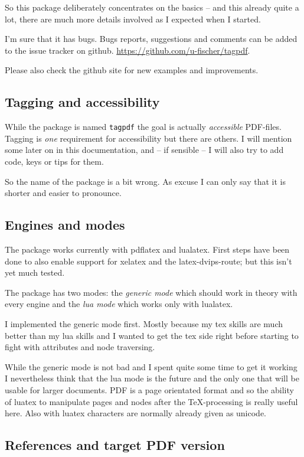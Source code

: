 \documentclass[DIV=12,parskip=half-,bibliography=totoc]{scrartcl}
\newcommand\PDF{PDF}
\begin{document}
So this package deliberately concentrates on the basics -- and this already quite a lot, there are much more details involved as I expected when I started.

I'm sure that it has bugs. Bugs reports, suggestions and comments can be added to the issue tracker on github. \url{https://github.com/u-fischer/tagpdf}.

Please also check the github site for new examples and improvements.

\subsection{Tagging and accessibility}

While the package is named \texttt{tagpdf} the goal is actually \emph{accessible} \PDF{}-files. Tagging is \emph{one} requirement for accessibility but there are others. I will mention some later on in this documentation, and -- if sensible -- I will also try to add code, keys or tips for them.

So the name of the package is a bit wrong. As excuse I can only say that it is shorter and easier to pronounce.


\subsection{Engines and modes}

The package works currently with pdflatex and lualatex. First steps have been done to also enable support for xelatex and the latex-dvips-route; but this isn't yet much tested.

The package has two modes: the \emph{generic mode} which should work in theory with every engine and the \emph{lua mode} which works only with lualatex.

I implemented the generic mode first. Mostly because my tex skills are much better than my lua skills and I wanted to get the tex side right before starting to fight with attributes and node traversing.

While the generic mode is not bad and I spent quite some time to get it working I nevertheless think that the lua mode is the future and the only one that will be usable for larger documents. \PDF{} is a page orientated format and so the ability of luatex to manipulate pages and nodes after the \TeX-processing is really useful here. Also with luatex characters are normally already given as unicode.


\subsection{References and target PDF version}
\end{document}
